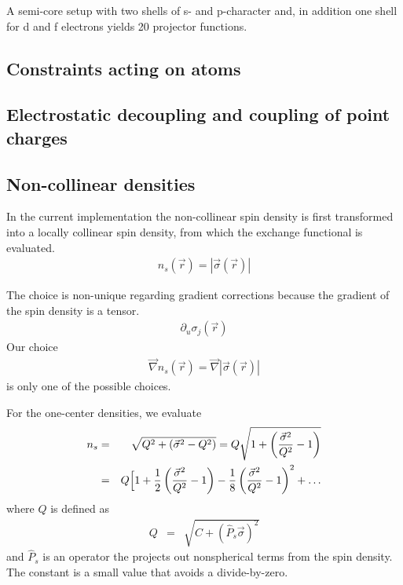 \documentclass[final,12pt,makeidx,DIV=calc]{article}
\begin{document}
{{{A semi-core setup with two shells of s- and p-character and, in
addition one shell for d and f electrons yields 20 projector
functions.




\subsection{Constraints acting on atoms}


\subsection{Electrostatic decoupling and coupling of point charges}

\subsection{Non-collinear densities}
\label{sec:noncollinear}
In the current implementation the non-collinear spin density is first
transformed into a locally collinear spin density, from which the
exchange functional is evaluated. 
\begin{eqnarray*}
n_s(\vec{r})= |\vec{\sigma}(\vec{r})|
\end{eqnarray*}

The choice is non-unique regarding gradient corrections because the
gradient of the spin density is a tensor.
\begin{eqnarray*}
\partial_u\sigma_j(\vec{r})
\end{eqnarray*}
Our choice
\begin{eqnarray*}
\vec{\nabla}n_s(\vec{r})=\vec{\nabla}|\vec{\sigma}(\vec{r})|
\end{eqnarray*}
is only one of the possible choices. 


For the one-center densities, we evaluate
\begin{eqnarray*}
n_s&=&\sqrt{Q^2+\left(\vec{\sigma}^2-Q^2\right)}
=Q\sqrt{1+\left(\frac{\vec{\sigma}^2}{Q^2}-1\right)}
\\
&=&Q\Bigl[1+\frac{1}{2}\left(\frac{\vec{\sigma}^2}{Q^2}-1\right)
-\frac{1}{8}\left(\frac{\vec{\sigma}^2}{Q^2}-1\right)^2+\ldots
\end{eqnarray*}
where $Q$ is defined as
\begin{eqnarray*}
Q&=&\sqrt{C+(\hat{P}_s\vec{\sigma})^2}
\end{eqnarray*}
and $\hat{P}_s$ is an operator the projects out nonspherical terms
from the spin density. The constant is a small value that avoids a 
divide-by-zero.

}}}
\end{document}
